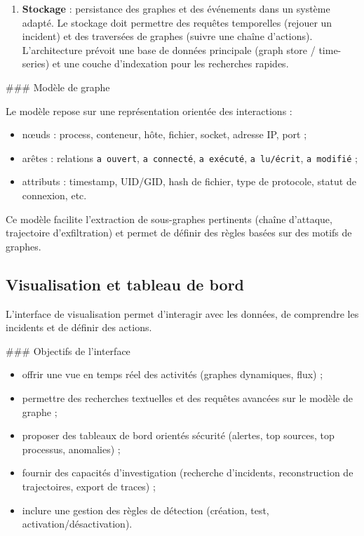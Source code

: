 \documentclass[a4paper,12pt]{article}
\begin{document}
\begin{enumerate}
\begin{itemize}
    \item repérage de chaînes d'actions (processus malveillants déclenchant des modifications système) ;
    \item alerting basé sur des seuils ou des modèles statistiques (comportement déviant par rapport au profil d'usage normal) ;
    \item corrélation avec des indicateurs de compromission externes (IOC) et des listes noires.
  \end{itemize}
  \item \textbf{Stockage} : persistance des graphes et des événements dans un système adapté. Le stockage doit permettre des requêtes temporelles (rejouer un incident) et des traversées de graphes (suivre une chaîne d'actions). L'architecture prévoit une base de données principale (graph store / time-series) et une couche d'indexation pour les recherches rapides.
\end{enumerate}

### Modèle de graphe

Le modèle repose sur une représentation orientée des interactions :

\begin{itemize}
  \item nœuds : process, conteneur, hôte, fichier, socket, adresse IP, port ;
  \item arêtes : relations \texttt{a ouvert}, \texttt{a connecté}, \texttt{a exécuté}, \texttt{a lu/écrit}, \texttt{a modifié} ;
  \item attributs : timestamp, UID/GID, hash de fichier, type de protocole, statut de connexion, etc.
\end{itemize}

Ce modèle facilite l'extraction de sous-graphes pertinents (chaîne d'attaque, trajectoire d'exfiltration) et permet de définir des règles basées sur des motifs de graphes.

\subsection{Visualisation et tableau de bord}

L'interface de visualisation permet d'interagir avec les données, de comprendre les incidents et de définir des actions.

### Objectifs de l'interface

\begin{itemize}
  \item offrir une vue en temps réel des activités (graphes dynamiques, flux) ;
  \item permettre des recherches textuelles et des requêtes avancées sur le modèle de graphe ;
  \item proposer des tableaux de bord orientés sécurité (alertes, top sources, top processus, anomalies) ;
  \item fournir des capacités d'investigation (recherche d'incidents, reconstruction de trajectoires, export de traces) ;
  \item inclure une gestion des règles de détection (création, test, activation/désactivation).
\end{itemize}
\end{document}
